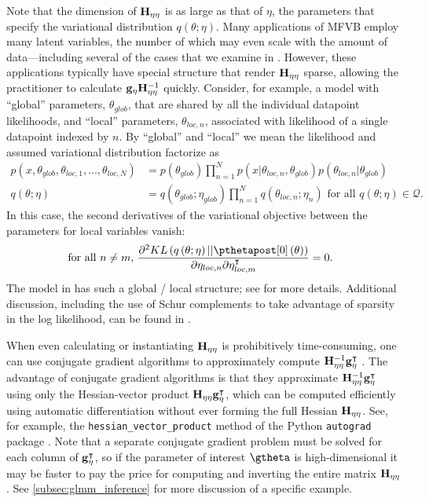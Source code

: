 \documentclass{article}\usepackage[]{graphicx}\usepackage[]{color}
\theoremstyle{definition}
\theoremstyle{plain}
\theoremstyle{plain}
\theoremstyle{plain}
\theoremstyle{definition}
\theoremstyle{plain}
\theoremstyle{plain}
\begin{document}
Note that the dimension of $\mathbf{H}_{\eta\eta}$ is as large as that of $\eta$,
the parameters that specify the variational distribution $q\left(\theta;\eta\right)$.
Many applications of MFVB employ many latent variables, the number of
which may even scale with the amount of data---including several of the
cases that we examine in . However, these applications
typically have special structure that render $\mathbf{H}_{\eta\eta}$ sparse, allowing the
practitioner to calculate $\mathbf{g}_{\eta}\mathbf{H}_{\eta\eta}^{-1}$ quickly. Consider,
for example, a model with ``global'' parameters, $\theta_{glob}$,
that are shared by all the individual datapoint likelihoods, and ``local''
parameters, $\theta_{loc,n}$, associated with likelihood of a single
datapoint indexed by $n$. By ``global'' and ``local'' we mean
the likelihood and assumed variational distribution factorize as
\begin{align}
p\left(x,\theta_{glob},\theta_{loc,1},...,\theta_{loc,N}\right) &
    =p\left(\theta_{glob}\right)\prod_{n=1}^{N}p\left(x\vert\theta_{loc,n},
    \theta_{glob}\right)p\left(\theta_{loc,n}\vert\theta_{glob}\right)
    \label{eq:global_local}\\
q\left(\theta;\eta\right) &
    =q\left(\theta_{glob};\eta_{glob}\right)\prod_{n=1}^{N}
    q\left(\theta_{loc,n};\eta_{n}\right)
    \textrm{ for all }q\left(\theta;\eta\right)\in\mathcal{Q}.\nonumber
\end{align}
In this case, the second derivatives of the variational objective
between the parameters for local variables vanish:
\begin{align*}
\textrm{ for all }n\ne m\textrm{, }
\frac{\partial^{2}KL\left(q\left(\theta;\eta\right)||
    \pzeropost\left(\theta\right)\right)}{\partial\eta_{loc,n}
    \partial\eta_{loc,m}^{\trans}} & =0.
\end{align*}
The model in  has such a global / local structure;
see  for more details. Additional discussion,
including the use of Schur complements to take advantage of sparsity in the log
likelihood, can be found in \citet{giordano:2015:lrvb}.

When even calculating or instantiating $\mathbf{H}_{\eta\eta}$ is prohibitively
time-consuming, one can use conjugate gradient algorithms to approximately
compute $\mathbf{H}_{\eta\eta}^{-1}\mathbf{g}_{\eta}^{\intercal}$ \citep[Chapter
5]{nocedalwright:1999:numerical}. The advantage of conjugate gradient algorithms
is that they approximate $\mathbf{H}_{\eta\eta}^{-1}\mathbf{g}_{\eta}^{\intercal}$ using only the
Hessian-vector product $\mathbf{H}_{\eta\eta}\mathbf{g}_{\eta}^{\intercal}$,
which can be computed efficiently using automatic differentiation without ever
forming the full Hessian $\mathbf{H}_{\eta\eta}$. See, for example, the
\texttt{hessian\_vector\_product} method of the Python \texttt{autograd} package
\citep{maclaurin:2015:autograd}. Note that a separate conjugate gradient problem
must be solved for each column of $\mathbf{g}_{\eta}^{\intercal}$, so if the parameter of
interest $\gtheta$ is high-dimensional it may be faster to pay the price for
computing and inverting the entire matrix $\mathbf{H}_{\eta\eta}$. See
\ref{subsec:glmm_inference} for more discussion of a specific example.
\end{document}
